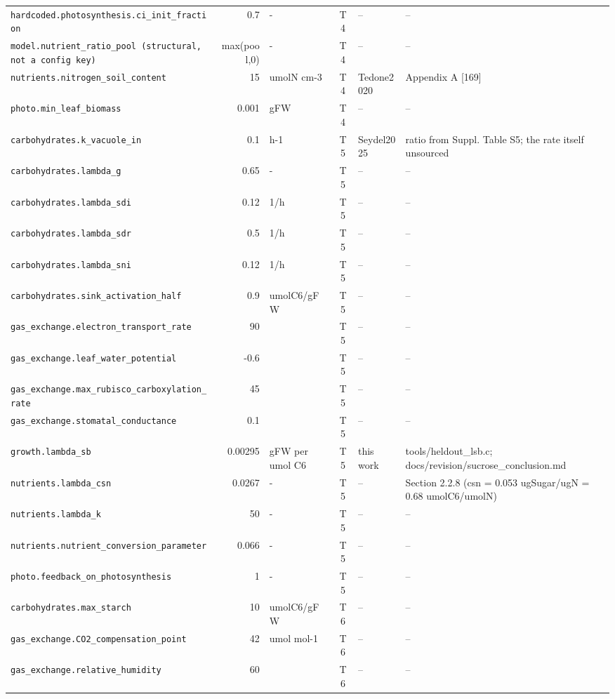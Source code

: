 \begin{table}[!htbp]
\begin{tabular}{@{}p{52mm}rp{20mm}cp{20mm}p{38mm}@{}}
\texttt{hardcoded.photosynthesis.ci\_init\_fraction} & 0.7 & - & T4 & -- & -- \\
\texttt{model.nutrient\_ratio\_pool (structural, not a config key)} & max(pool,0) & - & T4 & -- & -- \\
\texttt{nutrients.nitrogen\_soil\_content} & 15 & umolN cm-3 & T4 & Tedone2020 & Appendix A [169] \\
\texttt{photo.min\_leaf\_biomass} & 0.001 & gFW & T4 & -- & -- \\
\texttt{carbohydrates.k\_vacuole\_in} & 0.1 & h-1 & T5 & Seydel2025 & ratio from Suppl. Table S5; the rate itself unsourced \\
\texttt{carbohydrates.lambda\_g} & 0.65 & - & T5 & -- & -- \\
\texttt{carbohydrates.lambda\_sdi} & 0.12 & 1/h & T5 & -- & -- \\
\texttt{carbohydrates.lambda\_sdr} & 0.5 & 1/h & T5 & -- & -- \\
\texttt{carbohydrates.lambda\_sni} & 0.12 & 1/h & T5 & -- & -- \\
\texttt{carbohydrates.sink\_activation\_half} & 0.9 & umolC6/gFW & T5 & -- & -- \\
\texttt{gas\_exchange.electron\_transport\_rate} & 90 &  & T5 & -- & -- \\
\texttt{gas\_exchange.leaf\_water\_potential} & -0.6 &  & T5 & -- & -- \\
\texttt{gas\_exchange.max\_rubisco\_carboxylation\_rate} & 45 &  & T5 & -- & -- \\
\texttt{gas\_exchange.stomatal\_conductance} & 0.1 &  & T5 & -- & -- \\
\texttt{growth.lambda\_sb} & 0.00295 & gFW per umol C6 & T5 & this work & tools/heldout\_lsb.c; docs/revision/sucrose\_conclusion.md \\
\texttt{nutrients.lambda\_csn} & 0.0267 & - & T5 & -- & Section 2.2.8 (csn = 0.053 ugSugar/ugN = 0.68 umolC6/umolN) \\
\texttt{nutrients.lambda\_k} & 50 & - & T5 & -- & -- \\
\texttt{nutrients.nutrient\_conversion\_parameter} & 0.066 & - & T5 & -- & -- \\
\texttt{photo.feedback\_on\_photosynthesis} & 1 & - & T5 & -- & -- \\
\texttt{carbohydrates.max\_starch} & 10 & umolC6/gFW & T6 & -- & -- \\
\texttt{gas\_exchange.CO2\_compensation\_point} & 42 & umol mol-1 & T6 & -- & -- \\
\texttt{gas\_exchange.relative\_humidity} & 60 &  & T6 & -- & -- \\

\end{tabular}
\end{table}
